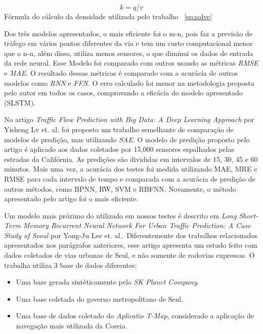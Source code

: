 \begin{equation}\label{eq:solve}
k = q / v
\end{equation}
Fórmula do cálculo da densidade utilizada pelo trabalho ~\ref{eq:solve}

Dos três modelos apresentados, o mais eficiente foi o m-n, pois faz a previsão de tráfego em vários pontos diferentes da via e tem um custo computacional menor que o n-n, além disso, utiliza menos sensores, o que diminui os dados de entrada da rede neural. Esse Modelo foi comparado com outros usando as métricas \textit{\acrshort{RMSE}} e \textit{\acrshort{MAE}}. O resultado dessas métricas é comparado com a acurácia de outros modelos como \textit{\acrfull{RNN}} e \textit{\acrfull{FFN}}. O erro calculado foi menor na metodologia proposta pelo autor em todos os casos, comprovando a eficácia do modelo apresentado (SLSTM).

No artigo \textit{Traffic Flow Prediction with Big Data: A Deep Learning Approach} \cite{lv_6894591} por Yisheng Lv et. al. foi proposto um trabalho semelhante de comparação de modelos de predição, mas utilizando \textit{\acrfull{SAE}}. O modelo de predição proposto pelo artigo é aplicado aos dados coletados por 15,000 sensores espalhados pelas estradas da Califórnia. As predições são divididas em intervalos de 15, 30, 45 e 60 minutos. Mais uma vez, a acurácia dos testes foi medida utilizando  \acrshort{MAE}, \acrshort{MRE} e \acrshort{RMSE} para cada intervalo de tempo e comparada com a acurácia de predição de outros métodos, como \acrfull{BPNN}, \acrfull{RW}, \acrfull{SVM} e \acrfull{RBFNN}. Novamente, o método apresentado pelo artigo foi o mais eficiente.

Um modelo mais próximo do utilizado em nossos testes é descrito em \textit{Long Short-Term Memory Recurrent Neural Network For Urban Traffic Prediction: A Case Study of Seoul} \cite{Seoul} por Yong-Ju Lee et. al.. Diferentemente dos trabalhos relacionados apresentados nos parágrafos anteriores, esse artigo apresenta um estudo feito com dados coletados de vias urbanas de Seul, e não somente de rodovias expressas. O trabalha utiliza 3 base de dados diferentes:

\begin{itemize}
    \item Uma base gerada sintéticamente pela \textit{SK Planet Company}.
    \item Uma base coletada do governo metropolitano de Seul.
    \item Uma base de dados coletado do \textit{Aplicatio T-Map}, considerado a aplicação de navegação mais utilizada da Coreia.
\end{itemize} 

